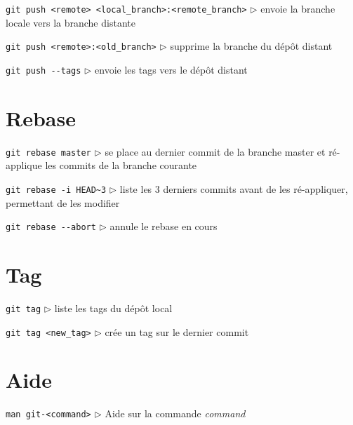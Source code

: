 \documentclass[a4paper,oneside,twocolumn]{article}
\begin{document}
\noindent\verb?git push <remote> <local_branch>:<remote_branch>?\linebreak
$\triangleright$ envoie la branche locale vers la branche distante

\noindent\verb?git push <remote>:<old_branch>?\linebreak
$\triangleright$ supprime la branche du dépôt distant

\noindent\verb?git push --tags?\linebreak
$\triangleright$ envoie les tags vers le dépôt distant

\vspace{-3mm}
\section{Rebase}
\vspace{-2mm}

\noindent\verb?git rebase master?\linebreak
$\triangleright$ se place au dernier commit de la branche master et ré-applique les commits de la branche courante

\noindent\verb?git rebase -i HEAD~3?\linebreak
$\triangleright$ liste les 3 derniers commits avant de les ré-appliquer, permettant de les modifier

\noindent\verb?git rebase --abort?\linebreak
$\triangleright$ annule le rebase en cours


\vspace{-3mm}
\section{Tag}
\vspace{-2mm}

\noindent\verb?git tag?\linebreak
$\triangleright$ liste les tags du dépôt local

\noindent\verb?git tag <new_tag>?\linebreak
$\triangleright$ crée un tag sur le dernier commit

\vspace{-3mm}
\section{Aide}
\vspace{-2mm}

\noindent\verb?man git-<command>?\linebreak
$\triangleright$ Aide sur la commande \emph{command}
\end{document}

